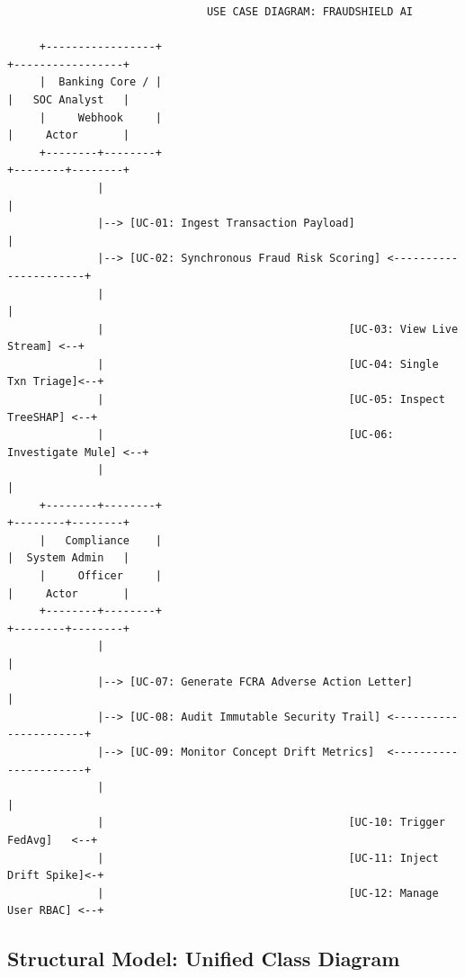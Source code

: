 \documentclass[12pt,a4paper,oneside]{report}
\begin{document}
\begin{lstlisting}
                               USE CASE DIAGRAM: FRAUDSHIELD AI

     +-----------------+                                                 +-----------------+
     |  Banking Core / |                                                 |   SOC Analyst   |
     |     Webhook     |                                                 |     Actor       |
     +--------+--------+                                                 +--------+--------+
              |                                                                   |
              |--> [UC-01: Ingest Transaction Payload]                           |
              |--> [UC-02: Synchronous Fraud Risk Scoring] <----------------------+
              |                                                                   |
              |                                      [UC-03: View Live Stream] <--+
              |                                      [UC-04: Single Txn Triage]<--+
              |                                      [UC-05: Inspect TreeSHAP] <--+
              |                                      [UC-06: Investigate Mule] <--+
              |                                                                   |
     +--------+--------+                                                 +--------+--------+
     |   Compliance    |                                                 |  System Admin   |
     |     Officer     |                                                 |     Actor       |
     +--------+--------+                                                 +--------+--------+
              |                                                                   |
              |--> [UC-07: Generate FCRA Adverse Action Letter]                  |
              |--> [UC-08: Audit Immutable Security Trail] <----------------------+
              |--> [UC-09: Monitor Concept Drift Metrics]  <----------------------+
              |                                                                   |
              |                                      [UC-10: Trigger FedAvg]   <--+
              |                                      [UC-11: Inject Drift Spike]<-+
              |                                      [UC-12: Manage User RBAC] <--+
\end{lstlisting}


\subsection{Structural Model: Unified Class Diagram}
\end{document}
